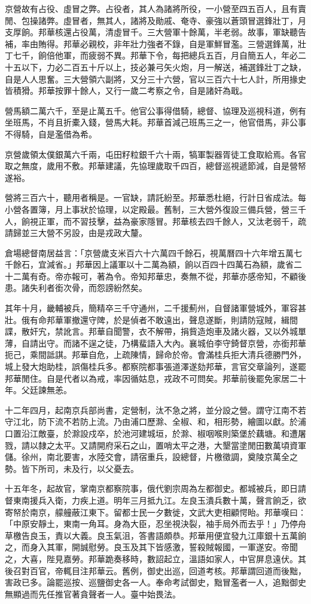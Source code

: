 \begin{pinyinscope}
京營故有占役、虛冒之弊。占役者，其人為諸將所役，一小營至四五百人，且有賣閒、包操諸弊。虛冒者，無其人，諸將及勛戚、奄寺、豪強以蒼頭冒選鋒壯丁，月支厚餉。邦華核還占役萬，清虛冒千。三大營軍十餘萬，半老弱。故事，軍缺聽告補，率由賄得。邦華必親校，非年壯力強者不錄，自是軍鮮冒濫。三營選鋒萬，壯丁七千，餉倍他軍，而疲弱不異。邦華下令，每把總兵五百，月自簡五人，年必二十五以下，力必二百五十斤以上，技必兼弓矢火炮，月一解送，補選鋒壯丁之缺，自是人人思奮。三大營領六副將，又分三十六營，官以三百六十七人計，所用掾史皆積猾。邦華按罪十餘人，又行一歲二考察之令，自是諸奸為戢。

營馬額二萬六千，至是止萬五千。他官公事得借騎，總督、協理及巡視科道，例有坐班馬，不肖且折橐入錢，營馬大耗。邦華首減己班馬三之一，他官借馬，非公事不得騎，自是濫借為希。

京營歲領太僕銀萬六千兩，屯田籽粒銀千六十兩，犒軍製器胥徒工食取給焉。各官取之無度，歲用不敷。邦華建議，先協理歲取千四百，總督巡視遞節減，自是營帑遂裕。

營將三百六十，聽用者稱是。一官缺，請託紛至。邦華悉杜絕，行計日省成法。每小營各置簿，月上事狀於協理，以定殿最。舊制，三大營外復設三備兵營，營三千人，餉視正軍，而不習技擊，益為豪家隱冒。邦華核去四千餘人，又汰老弱千，疏請歸並三大營不另設，由是戎政大釐。

倉場總督南居益言：「京營歲支米百六十六萬四千餘石，視萬曆四十六年增五萬七千餘石，宜減省。」邦華因上議軍以十二萬為額，餉以百四十四萬石為額，歲省二十二萬有奇。帝亦報可，著為令。帝知邦華忠，奏無不從，邦華亦感帝知，不顧後患。諸失利者銜次骨，而怨謗紛然矣。

其年十月，畿輔被兵，簡精卒三千守通州，二千援薊州，自督諸軍營城外，軍容甚壯。俄有命邦華軍撤還守陴，於是偵者不敢遠出，聲息遂斷，則請防寇賊，緝間諜，散奸宄，禁訛言。邦華自聞警，衣不解帶，捐貲造炮車及諸火器，又以外城單薄，自請出守。而諸不逞之徒，乃構蜚語入大內。襄城伯李守錡督京營，亦銜邦華扼己，乘間詆諆。邦華自危，上疏陳情，歸命於帝。會滿桂兵拒大清兵德勝門外，城上發大炮助桂，誤傷桂兵多。都察院都事張道澤遂劾邦華，言官交章論列，遂罷邦華閒住。自是代者以為戒，率因循姑息，戎政不可問矣。邦華前後罷免家居二十年。父廷諫無恙。

十二年四月，起南京兵部尚書，定營制，汰不急之將，並分設之營。謂守江南不若守江北，防下流不若防上流。乃由浦口歷滁、全椒、和，相形勢，繪圖以獻。於浦口置沿江敵臺，於滁設戍卒，於池河建城垣，於滁、椒咽喉則築堡於藕塘。和遭屠戮，請以隸之太平。又請開府采石之山，置哨太平之港，大墾當塗閒田數萬頃資軍儲。徐州，南北要害，水陸交會，請宿重兵，設總督，片檄徵調，奠陵京萬全之勢。皆下所司，未及行，以父憂去。

十五年冬，起故官，掌南京都察院事，俄代劉宗周為左都御史。都城被兵，即日請督東南援兵入衛，力疾上道。明年三月抵九江。左良玉潰兵數十萬，聲言餉乏，欲寄帑於南京，艨艟蔽江東下。留都士民一夕數徙，文武大吏相顧愕眙。邦華嘆曰：「中原安靜土，東南一角耳。身為大臣，忍坐視決裂，袖手局外而去乎！」乃停舟草檄告良玉，責以大義。良玉氣沮，答書語頗恭。邦華用便宜發九江庫銀十五萬餉之，而身入其軍，開誠慰勞。良玉及其下皆感激，誓殺賊報國，一軍遂安。帝聞之，大喜，陛見嘉勞。邦華跪奏移時，數詔起立，溫語如家人，中官屏息遠伏。其後召對百官，帝輒目注邦華云。舊例，御史出巡，回道考核。邦華謂回道而後黜，害政已多。論罷巡按、巡鹽御史各一人。奉命考試御史，黜冒濫者一人，追黜御史無顯過而先任推官著貪聲者一人。臺中始畏法。


\end{pinyinscope}
